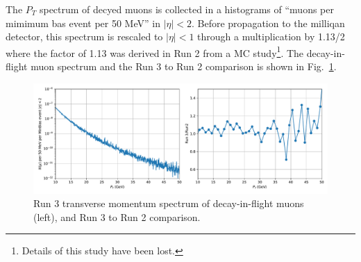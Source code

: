 \documentclass[12pt]{article}
\begin{document}
The $P_T$ spectrum of decyed muons is collected in a histograms of
``muons per mimimum bas event per 50 MeV'' in $|\eta|<2$.
Before propagation to the milliqan detector, this spectrum is rescaled to $|\eta|<1$
through a multiplication by 1.13/2 where the factor of 1.13 was
derived in Run 2 from a MC study\footnote{Details of this study have been lost.}.
The decay-in-flight muon spectrum and the Run 3 to Run 2 comparison is
shown in Fig.~\ref{fig:dof_muons}.

\begin{figure}[H]
\includegraphics[width=1.0\linewidth]{../mesonPt/mu_nonbc.pdf}  
\caption{Run 3 transverse momentum spectrum of decay-in-flight
  muons (left), and Run 3 to Run 2 comparison.}
  \label{fig:dof_muons}
\end{figure}


\clearpage
\end{document}
